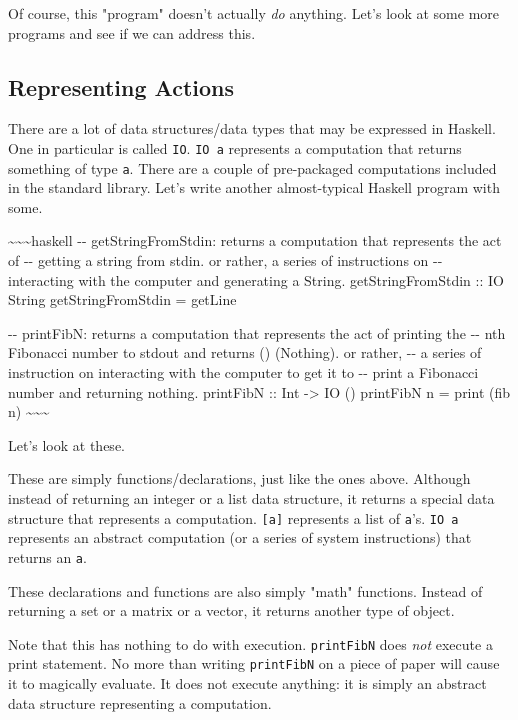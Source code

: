 \documentclass[]{article}
\begin{document}
Of course, this "program" doesn't actually \emph{do} anything. Let's look at
some more programs and see if we can address this.

\subsection{Representing Actions}

There are a lot of data structures/data types that may be expressed in Haskell.
One in particular is called \texttt{IO}. \texttt{IO\ a} represents a computation
that returns something of type \texttt{a}. There are a couple of pre-packaged
computations included in the standard library. Let's write another
almost-typical Haskell program with some.

\textasciitilde{}\textasciitilde{}\textasciitilde{}haskell -\/-
getStringFromStdin: returns a computation that represents the act of -\/-
getting a string from stdin. or rather, a series of instructions on -\/-
interacting with the computer and generating a String. getStringFromStdin :: IO
String getStringFromStdin = getLine

-\/- printFibN: returns a computation that represents the act of printing the
-\/- nth Fibonacci number to stdout and returns () (Nothing). or rather, -\/- a
series of instruction on interacting with the computer to get it to -\/- print a
Fibonacci number and returning nothing. printFibN :: Int -\textgreater{} IO ()
printFibN n = print (fib n) \textasciitilde{}\textasciitilde{}\textasciitilde{}

Let's look at these.

These are simply functions/declarations, just like the ones above. Although
instead of returning an integer or a list data structure, it returns a special
data structure that represents a computation. \texttt{{[}a{]}} represents a list
of \texttt{a}'s. \texttt{IO\ a} represents an abstract computation (or a series
of system instructions) that returns an \texttt{a}.

These declarations and functions are also simply "math" functions. Instead of
returning a set or a matrix or a vector, it returns another type of object.

Note that this has nothing to do with execution. \texttt{printFibN} does
\emph{not} execute a print statement. No more than writing \texttt{printFibN} on
a piece of paper will cause it to magically evaluate. It does not execute
anything: it is simply an abstract data structure representing a computation.
\end{document}

